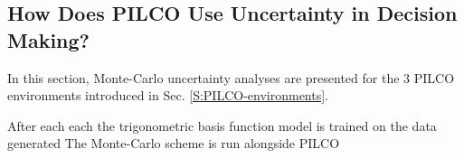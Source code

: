 
\subsection{How Does PILCO Use Uncertainty in Decision Making?}
In this section, Monte-Carlo uncertainty analyses  are presented for the 3 PILCO environments introduced in Sec. \ref{S:PILCO-environments}. 


After each each  the trigonometric basis function model is trained on the data generated The Monte-Carlo scheme is run alongside PILCO 

